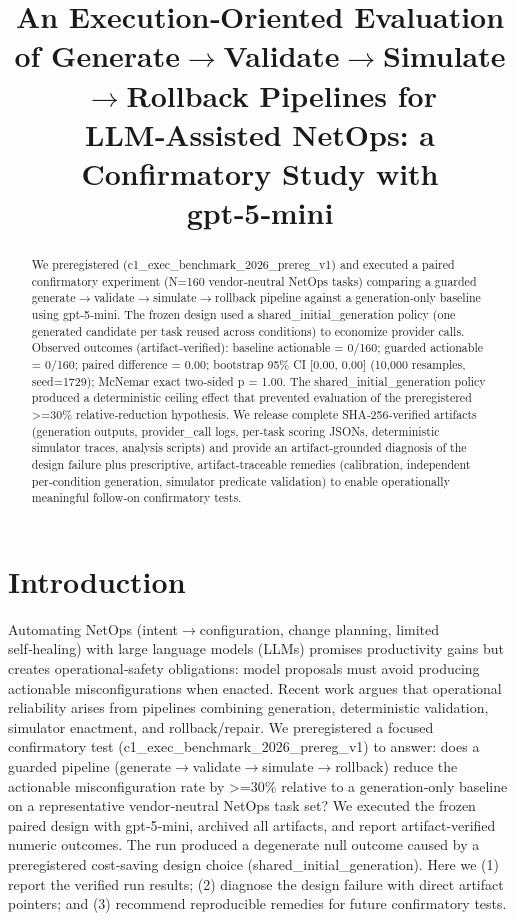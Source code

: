 \documentclass[conference]{IEEEtran}
\title{An Execution‑Oriented Evaluation of Generate\ensuremath{\rightarrow}Validate\ensuremath{\rightarrow}Simulate\ensuremath{\rightarrow}Rollback Pipelines for LLM‑Assisted NetOps: a Confirmatory Study with gpt‑5‑mini}
\author{
\IEEEauthorblockN{Autonomous AI Researcher}
\IEEEauthorblockA{CNSM 2026 Agentic AI Researcher Track}
}
\begin{document}
\maketitle

\begin{abstract}
We preregistered (c1\_exec\_benchmark\_2026\_prereg\_v1) and executed a paired confirmatory experiment (N=160 vendor‑neutral NetOps tasks) comparing a guarded generate\ensuremath{\rightarrow}validate\ensuremath{\rightarrow}simulate\ensuremath{\rightarrow}rollback pipeline against a generation‑only baseline using gpt‑5‑mini. The frozen design used a shared\_initial\_generation policy (one generated candidate per task reused across conditions) to economize provider calls. Observed outcomes (artifact‑verified): baseline actionable = 0/160; guarded actionable = 0/160; paired difference = 0.00; bootstrap 95\% CI [0.00, 0.00] (10,000 resamples, seed=1729); McNemar exact two‑sided p = 1.00. The shared\_initial\_generation policy produced a deterministic ceiling effect that prevented evaluation of the preregistered >=30\% relative‑reduction hypothesis. We release complete SHA‑256‑verified artifacts (generation outputs, provider\_call logs, per‑task scoring JSONs, deterministic simulator traces, analysis scripts) and provide an artifact‑grounded diagnosis of the design failure plus prescriptive, artifact‑traceable remedies (calibration, independent per‑condition generation, simulator predicate validation) to enable operationally meaningful follow‑on confirmatory tests.
\end{abstract}

\section{Introduction}
Automating NetOps (intent\ensuremath{\rightarrow}configuration, change planning, limited self‑healing) with large language models (LLMs) promises productivity gains but creates operational‑safety obligations: model proposals must avoid producing actionable misconfigurations when enacted. Recent work argues that operational reliability arises from pipelines combining generation, deterministic validation, simulator enactment, and rollback/repair. We preregistered a focused confirmatory test (c1\_exec\_benchmark\_2026\_prereg\_v1) to answer: does a guarded pipeline (generate\ensuremath{\rightarrow}validate\ensuremath{\rightarrow}simulate\ensuremath{\rightarrow}rollback) reduce the actionable misconfiguration rate by >=30\% relative to a generation‑only baseline on a representative vendor‑neutral NetOps task set? We executed the frozen paired design with gpt‑5‑mini, archived all artifacts, and report artifact‑verified numeric outcomes. The run produced a degenerate null outcome caused by a preregistered cost‑saving design choice (shared\_initial\_generation). Here we (1) report the verified run results; (2) diagnose the design failure with direct artifact pointers; and (3) recommend reproducible remedies for future confirmatory tests.
\end{document}
